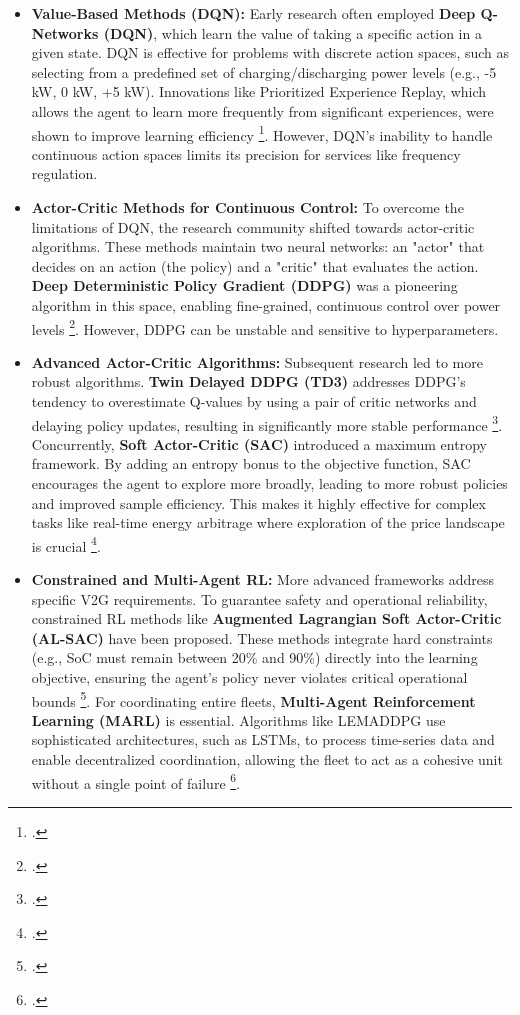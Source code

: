 \begin{itemize}
    \item \textbf{Value-Based Methods (DQN):} Early research often employed \textbf{Deep Q-Networks (DQN)}, which learn the value of taking a specific action in a given state. DQN is effective for problems with discrete action spaces, such as selecting from a predefined set of charging/discharging power levels (e.g., -5 kW, 0 kW, +5 kW). Innovations like Prioritized Experience Replay, which allows the agent to learn more frequently from significant experiences, were shown to improve learning efficiency \footcite{schaul2015prioritized}. However, DQN's inability to handle continuous action spaces limits its precision for services like frequency regulation.
    \item \textbf{Actor-Critic Methods for Continuous Control:} To overcome the limitations of DQN, the research community shifted towards actor-critic algorithms. These methods maintain two neural networks: an "actor" that decides on an action (the policy) and a "critic" that evaluates the action. \textbf{Deep Deterministic Policy Gradient (DDPG)} was a pioneering algorithm in this space, enabling fine-grained, continuous control over power levels \footcite{orfanoudakis2022deep, alfaverh2022optimal}. However, DDPG can be unstable and sensitive to hyperparameters.
    \item \textbf{Advanced Actor-Critic Algorithms:} Subsequent research led to more robust algorithms. \textbf{Twin Delayed DDPG (TD3)} addresses DDPG's tendency to overestimate Q-values by using a pair of critic networks and delaying policy updates, resulting in significantly more stable performance \footcite{liu2023optimal, wang2022multi}. Concurrently, \textbf{Soft Actor-Critic (SAC)} introduced a maximum entropy framework. By adding an entropy bonus to the objective function, SAC encourages the agent to explore more broadly, leading to more robust policies and improved sample efficiency. This makes it highly effective for complex tasks like real-time energy arbitrage where exploration of the price landscape is crucial \footcite{orfanoudakis2022deep}.
    \item \textbf{Constrained and Multi-Agent RL:} More advanced frameworks address specific V2G requirements. To guarantee safety and operational reliability, constrained RL methods like \textbf{Augmented Lagrangian Soft Actor-Critic (AL-SAC)} have been proposed. These methods integrate hard constraints (e.g., SoC must remain between 20\% and 90\%) directly into the learning objective, ensuring the agent's policy never violates critical operational bounds \footcite{orfanoudakis2022deep}. For coordinating entire fleets, \textbf{Multi-Agent Reinforcement Learning (MARL)} is essential. Algorithms like LEMADDPG use sophisticated architectures, such as LSTMs, to process time-series data and enable decentralized coordination, allowing the fleet to act as a cohesive unit without a single point of failure \footcite{liu2023optimal}.
\end{itemize}


